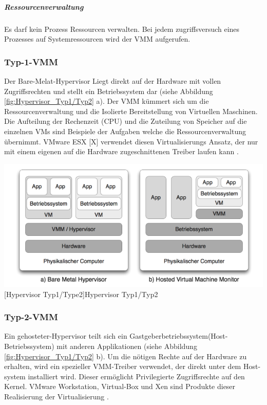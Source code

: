 \subparagraph{Ressourcenverwaltung}

Es darf kein Prozess Ressourcen verwalten. Bei jedem zugriffsversuch eines Prozesses auf Systemressourcen wird der VMM aufgerufen.

\subsubsection{Typ-1-VMM}
Der Bare-Melat-Hypervisor Liegt direkt auf der Hardware mit vollen Zugriffsrechten und stellt ein Betriebssystem dar (siehe Abbildung \ref{fig:Hypervisor_Typ1/Typ2} a). Der VMM kümmert sich um die Ressourcenverwaltung und die Isolierte Bereitstellung von Virtuellen Maschinen. Die Aufteilung der Rechenzeit (CPU) und die Zuteilung von Speicher auf die einzelnen VMs sind Beispiele der Aufgaben welche die Ressourcenverwaltung übernimmt. VMware ESX [X] verwendet diesen Virtualisierungs Ansatz, der nur mit einem eigenen auf die Hardware zugeschnittenen Treiber laufen kann \cite{Glatz2015Betriebssysteme}.

\vspace{1em}
\begin{minipage}{\linewidth}
	\centering
	\includegraphics[width=1\linewidth]{pics/Hypervisoren.PNG}
	[Hypervisor Typ1/Type2]{Hypervisor Typ1/Typ2 \cite{Meinel2011VirtualisierungMarktubersicht} }
	\label{fig:Hypervisor_Typ1/Typ2}
\end{minipage}

\subsubsection{Typ-2-VMM}
Ein gehosteter-Hypervisor teilt sich ein Gastgeberbetriebssystem(Host-Betriebssystem) mit anderen Applikationen (siehe Abbildung \ref{fig:Hypervisor_Typ1/Typ2} b). Um die nötigen Rechte auf der Hardware zu erhalten, wird ein spezieller VMM-Treiber verwendet, der direkt unter dem Host-system installiert wird. Dieser ermöglicht Privilegierte Zugriffsrechte auf den Kernel. VMware Workstation, Virtual-Box und Xen sind Produkte dieser Realisierung der Virtualisierung \cite{Glatz2015Betriebssysteme}.

